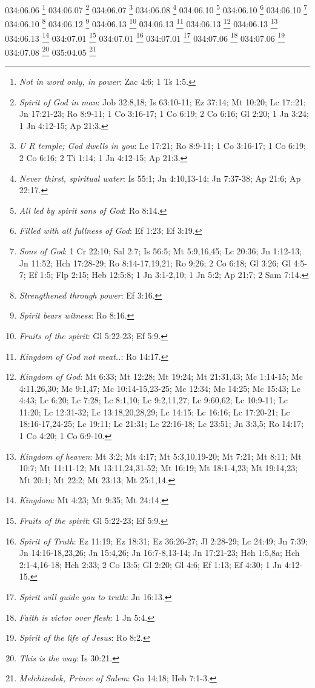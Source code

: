 {034:06.06 \footnote{\textit{Not in word only, in power}: Zac 4:6; 1 Ts 1:5.}
034:06.07 \footnote{\textit{Spirit of God in man}: Job 32:8,18; Is 63:10-11; Ez 37:14; Mt 10:20; Lc 17::21; Jn 17:21-23; Ro 8:9-11; 1 Co 3:16-17; 1 Co 6:19; 2 Co 6:16; Gl 2:20; 1 Jn 3:24; 1 Jn 4:12-15; Ap 21:3.}
034:06.07 \footnote{\textit{U R temple; God dwells in you}: Lc 17:21; Ro 8:9-11; 1 Co 3:16-17; 1 Co 6:19; 2 Co 6:16; 2 Ti 1:14; 1 Jn 4:12-15; Ap 21:3.}
034:06.08 \footnote{\textit{Never thirst, spiritual water}: Is 55:1; Jn 4:10,13-14; Jn 7:37-38; Ap 21:6; Ap 22:17.}
034:06.10 \footnote{\textit{All led by spirit sons of God}: Ro 8:14.}
034:06.10 \footnote{\textit{Filled with all fullness of God}: Ef 1:23; Ef 3:19.}
034:06.10 \footnote{\textit{Sons of God}: 1 Cr 22:10; Sal 2:7; Is 56:5; Mt 5:9,16,45; Lc 20:36; Jn 1:12-13; Jn 11:52; Hch 17:28-29; Ro 8:14-17,19,21; Ro 9:26; 2 Co 6:18; Gl 3:26; Gl 4:5-7; Ef 1:5; Flp 2:15; Heb 12:5:8; 1 Jn 3:1-2,10; 1 Jn 5:2; Ap 21:7; 2 Sam 7:14.}
034:06.10 \footnote{\textit{Strengthened through power}: Ef 3:16.}
034:06.12 \footnote{\textit{Spirit bears witness}: Ro 8:16.}
034:06.13 \footnote{\textit{Fruits of the spirit}: Gl 5:22-23; Ef 5:9.}
034:06.13 \footnote{\textit{Kingdom of God not meat..}: Ro 14:17.}
034:06.13 \footnote{\textit{Kingdom of God}: Mt 6:33; Mt 12:28; Mt 19:24; Mt 21:31,43; Mc 1:14-15; Mc 4:11,26,30; Mc 9:1,47; Mc 10:14-15,23-25; Mc 12:34; Mc 14:25; Mc 15:43; Lc 4:43; Lc 6:20; Lc 7:28; Lc 8:1,10; Lc 9:2,11,27; Lc 9:60,62; Lc 10:9-11; Lc 11:20; Lc 12:31-32; Lc 13:18,20,28,29; Lc 14:15; Lc 16:16; Lc 17:20-21; Lc 18:16-17,24-25; Lc 19:11; Lc 21:31; Lc 22:16-18; Lc 23:51; Jn 3:3,5; Ro 14:17; 1 Co 4:20; 1 Co 6:9-10.}
034:06.13 \footnote{\textit{Kingdom of heaven}: Mt 3:2; Mt 4:17; Mt 5:3,10,19-20; Mt 7:21; Mt 8:11; Mt 10:7; Mt 11:11-12; Mt 13:11,24,31-52; Mt 16:19; Mt 18:1-4,23; Mt 19:14,23; Mt 20:1; Mt 22:2; Mt 23:13; Mt 25:1,14.}
034:06.13 \footnote{\textit{Kingdom}: Mt 4:23; Mt 9:35; Mt 24:14.}
034:07.01 \footnote{\textit{Fruits of the spirit}: Gl 5:22-23; Ef 5:9.}
034:07.01 \footnote{\textit{Spirit of Truth}: Ez 11:19; Ez 18:31; Ez 36:26-27; Jl 2:28-29; Lc 24:49; Jn 7:39; Jn 14:16-18,23,26; Jn 15:4,26; Jn 16:7-8,13-14; Jn 17:21-23; Hch 1:5,8a; Hch 2:1-4,16-18; Hch 2:33; 2 Co 13:5; Gl 2:20; Gl 4:6; Ef 1:13; Ef 4:30; 1 Jn 4:12-15.}
034:07.01 \footnote{\textit{Spirit will guide you to truth}: Jn 16:13.}
034:07.06 \footnote{\textit{Faith is victor over flesh}: 1 Jn 5:4.}
034:07.06 \footnote{\textit{Spirit of the life of Jesus}: Ro 8:2.}
034:07.08 \footnote{\textit{This is the way}: Is 30:21.}
035:04.05 \footnote{\textit{Melchizedek, Prince of Salem}: Gn 14:18; Heb 7:1-3.}
}
